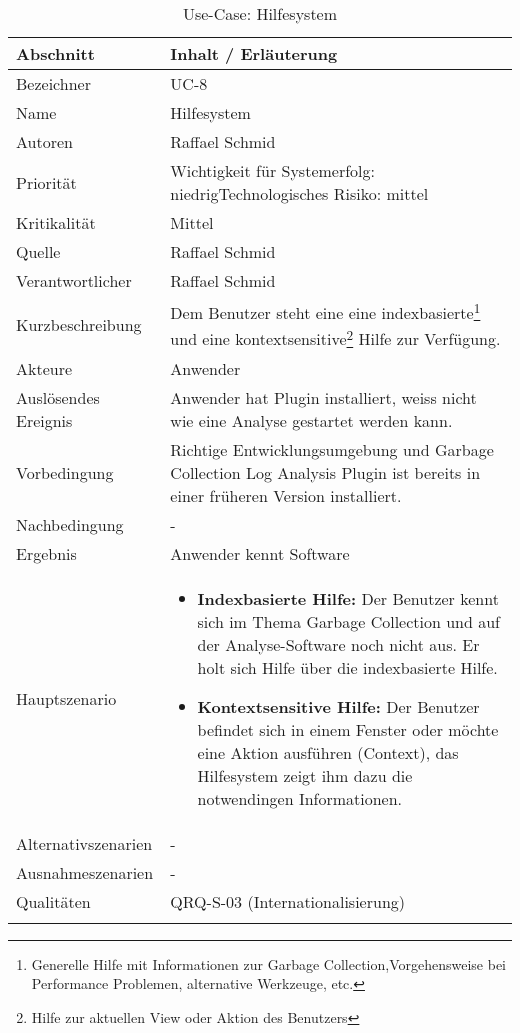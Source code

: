 \begin{longtable}{|p{4cm}|p{10.5cm}|}
\hline
   \textbf{Abschnitt} & \textbf{Inhalt / Erläuterung} \\\hline
   Bezeichner & UC-8\\\hline
   Name & Hilfesystem\\\hline
   Autoren & Raffael Schmid\\\hline
   Priorität & Wichtigkeit für Systemerfolg: niedrig\newline Technologisches Risiko: mittel\\\hline
   Kritikalität & Mittel\\\hline
   Quelle & Raffael Schmid\\\hline
   Verantwortlicher & Raffael Schmid\\\hline
   Kurzbeschreibung & Dem Benutzer steht eine eine indexbasierte\footnote{Generelle Hilfe mit Informationen zur Garbage Collection,Vorgehensweise bei Performance Problemen, alternative Werkzeuge, etc.} und eine kontextsensitive\footnote{Hilfe zur aktuellen View oder Aktion des Benutzers} Hilfe zur Verfügung. \\\hline
   Akteure & Anwender\\\hline
   Auslösendes Ereignis & Anwender hat Plugin installiert, weiss nicht wie eine Analyse gestartet werden kann.\\\hline
   Vorbedingung & Richtige Entwicklungsumgebung und Garbage Collection Log Analysis Plugin ist bereits in einer früheren Version installiert.\\\hline
   Nachbedingung & -\\\hline
   Ergebnis & Anwender kennt Software\\\hline
   Hauptszenario &	\begin{itemize}
		\item \textbf{Indexbasierte Hilfe: } Der Benutzer kennt sich im Thema Garbage Collection und auf der Analyse-Software noch nicht aus. Er holt sich Hilfe über die indexbasierte Hilfe. 
		\item \textbf{Kontextsensitive Hilfe: } Der Benutzer befindet sich in einem Fenster oder möchte eine Aktion ausführen (Context), das Hilfesystem zeigt ihm dazu die notwendingen Informationen.
	\end{itemize}
	\\\hline
   Alternativszenarien & -\\\hline
   Ausnahmeszenarien & -\\\hline
   Qualitäten & QRQ-S-03 (Internationalisierung)\\\hline
\caption{Use-Case: Hilfesystem}
\end{longtable}

